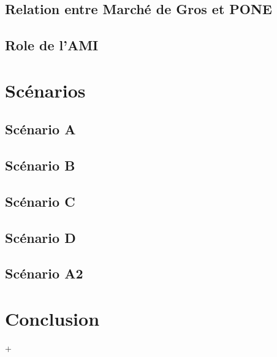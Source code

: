\documentclass[a4paper, 11pt]{report}
\begin{document}
\subsection{Relation entre Marché de Gros et PONE}


\subsection{Role de l'AMI}


\section{Scénarios}


\subsection{Scénario A}


\subsection{Scénario B}


\subsection{Scénario C}


\subsection{Scénario D}


\subsection{Scénario A2}


\section{Conclusion}


+
\end{document}

